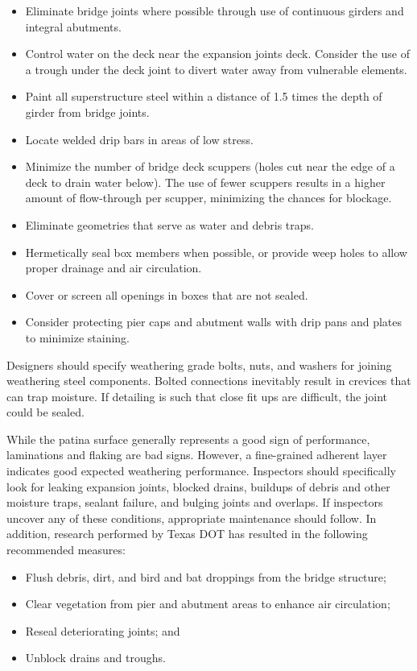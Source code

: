 \begin{itemize}
  \item Eliminate bridge joints where possible through use of continuous girders and integral abutments.
  \item Control water on the deck near the expansion joints deck. Consider the use of a trough under the deck joint
  to divert water away from vulnerable elements.
  \item Paint all superstructure steel within a distance of 1.5 times the depth of girder from bridge joints.
  \item Locate welded drip bars in areas of low stress.
  \item Minimize the number of bridge deck scuppers (holes cut near the edge of a deck to drain water below). The
  use of fewer scuppers results in a higher amount of flow-through per scupper, minimizing the chances for
  blockage.
  \item Eliminate geometries that serve as water and debris traps.
  \item Hermetically seal box members when possible, or provide weep holes to allow proper drainage and air
  circulation.
  \item Cover or screen all openings in boxes that are not sealed.
  \item Consider protecting pier caps and abutment walls with drip pans and plates to minimize staining.
\end{itemize}

Designers should specify weathering grade bolts, nuts, and washers for joining weathering steel components.
Bolted connections inevitably result in crevices that can trap moisture. If detailing is such that close fit ups are
difficult, the joint could be sealed.

While the patina surface generally represents a good sign of performance, laminations and flaking are bad signs.
However, a fine-grained adherent layer indicates good expected weathering performance. Inspectors should
specifically look for leaking expansion joints, blocked drains, buildups of debris and other moisture traps, sealant
failure, and bulging joints and overlaps. If inspectors uncover any of these conditions, appropriate maintenance
should follow. In addition, research performed by Texas DOT has resulted in the following recommended measures:

\begin{itemize}
  \item Flush debris, dirt, and bird and bat droppings from the bridge structure;
  \item Clear vegetation from pier and abutment areas to enhance air circulation;
  \item Reseal deteriorating joints; and
  \item Unblock drains and troughs.
\end{itemize}

